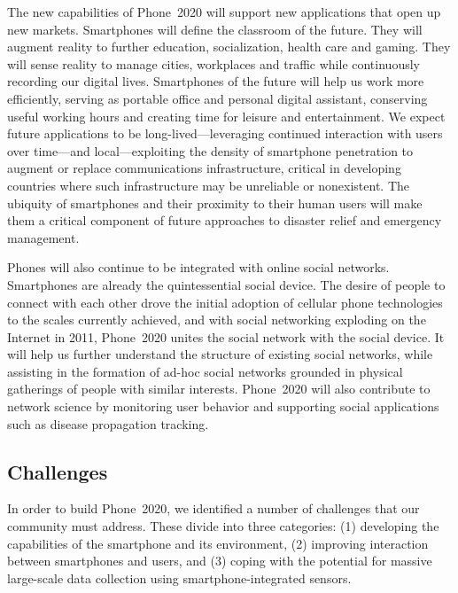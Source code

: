 The new capabilities of Phone~2020 will support new applications that open up
new markets. Smartphones will define the classroom of the future. They will
augment reality to further education, socialization, health care and gaming.
They will sense reality to manage cities, workplaces and traffic while
continuously recording our digital lives. Smartphones of the future will help
us work more efficiently, serving as portable office and personal digital
assistant, conserving useful working hours and creating time for leisure and
entertainment. We expect future applications to be long-lived---leveraging
continued interaction with users over time---and local---exploiting the
density of smartphone penetration to augment or replace communications
infrastructure, critical in developing countries where such infrastructure
may be unreliable or nonexistent. The ubiquity of smartphones and their
proximity to their human users will make them a critical component of future
approaches to disaster relief and emergency management.
 
Phones will also continue to be integrated with online social networks.
Smartphones are already the quintessential social device. The desire of
people to connect with each other drove the initial adoption of cellular
phone technologies to the scales currently achieved, and with social
networking exploding on the Internet in 2011, Phone~2020 unites the social
network with the social device. It will help us further understand the
structure of existing social networks, while assisting in the formation of
ad-hoc social networks grounded in physical gatherings of people with similar
interests. Phone~2020 will also contribute to network science by monitoring
user behavior and supporting social applications such as disease propagation
tracking.

\subsection{Challenges}

In order to build Phone~2020, we identified a number of challenges that our
community must address. These divide into three categories: (1) developing
the capabilities of the smartphone and its environment, (2) improving
interaction between smartphones and users, and (3) coping with the potential
for massive large-scale data collection using smartphone-integrated sensors.
 
